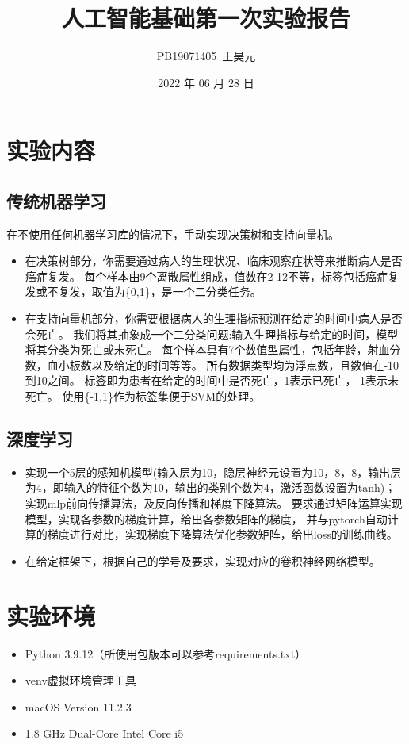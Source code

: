 \documentclass[UTF8]{article}
\title{人工智能基础第一次实验报告}
\author{PB19071405\ 王昊元}
\date{2022 年 06 月 28 日}
\begin{document}
    \maketitle

    \section{实验内容}
    \subsection{传统机器学习}
    在不使用任何机器学习库的情况下，手动实现决策树和支持向量机。
    \begin{itemize}
        \item 在决策树部分，你需要通过病人的生理状况、临床观察症状等来推断病人是否癌症复发。
        每个样本由9个离散属性组成，值数在2-12不等，标签包括癌症复发或不复发，取值为\{0,1\}，是一个二分类任务。
        \item 在支持向量机部分，你需要根据病人的生理指标预测在给定的时间中病人是否会死亡。
        我们将其抽象成一个二分类问题:输入生理指标与给定的时间，模型将其分类为死亡或未死亡。
        每个样本具有7个数值型属性，包括年龄，射血分数，血小板数以及给定的时间等等。
        所有数据类型均为浮点数，且数值在-10到10之间。
        标签即为患者在给定的时间中是否死亡，1表示已死亡，-1表示未死亡。
        使用\{-1,1\}作为标签集便于SVM的处理。
    \end{itemize}
    \subsection{深度学习}
    \begin{itemize}
        \item 实现一个5层的感知机模型(输入层为10，隐层神经元设置为10，8，8，输出层为4，即输入的特征个数为10，输出的类别个数为4，激活函数设置为tanh)；
        实现mlp前向传播算法，及反向传播和梯度下降算法。
        要求通过矩阵运算实现模型，实现各参数的梯度计算，给出各参数矩阵的梯度，
        并与pytorch自动计算的梯度进行对比，实现梯度下降算法优化参数矩阵，给出loss的训练曲线。
        \item 在给定框架下，根据自己的学号及要求，实现对应的卷积神经网络模型。
    \end{itemize}
    \section{实验环境}
    \begin{itemize}
        \item Python 3.9.12（所使用包版本可以参考{\jetbrains requirements.txt}）
        \item venv虚拟环境管理工具
        \item macOS Version 11.2.3
        \item 1.8 GHz Dual-Core Intel Core i5
    \end{itemize}
\end{document}
